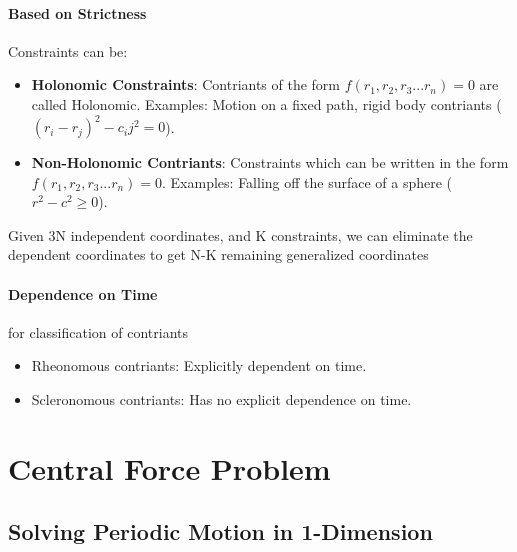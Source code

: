 \paragraph{Based on Strictness} Constraints can be:
\begin{itemize}
    \item \textbf{Holonomic Constraints}: Contriants of the form $ f(r_1, r_2, r_3 ... r_n) = 0 $ are called Holonomic. Examples: Motion on a fixed path, rigid body contriants ($(r_i - r_j)^2 - c_ij^2 = 0$).
    \item \textbf{Non-Holonomic Contriants}: Constraints which can be written in the form $ f(r_1, r_2, r_3 ... r_n) = 0 $. Examples: Falling off the surface of a sphere ($ r^2 - c^2 \geq 0 $).
\end{itemize}
Given 3N independent coordinates, and K constraints, we can eliminate the dependent coordinates to get N-K remaining generalized coordinates 

\paragraph{Dependence on Time} for classification of contriants
\begin{itemize}
    \item Rheonomous contriants: Explicitly dependent on time.
    \item Scleronomous contriants: Has no explicit dependence on time.
\end{itemize}



\section{Central Force Problem}


\subsection{Solving Periodic Motion in 1-Dimension}

